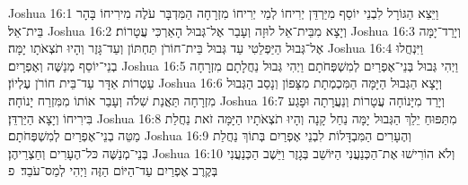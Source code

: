 Joshua 16:1	וַיֵּצֵא הַגּוֹרָל לִבְנֵי יוֹסֵף מִיַּרְדֵּן יְרִיחוֹ לְמֵי יְרִיחוֹ מִזְרָחָה הַמִּדְבָּר עֹלֶה מִירִיחוֹ בָּהָר בֵּית־אֵל׃
Joshua 16:2	וְיָצָא מִבֵּית־אֵל לוּזָה וְעָבַר אֶל־גְּבוּל הָאַרְכִּי עֲטָרוֹת׃
Joshua 16:3	וְיָרַד־יָמָּה אֶל־גְּבוּל הַיַּפְלֵטִי עַד גְּבוּל בֵּית־חוֹרֹן תַּחְתּוֹן וְעַד־גָּזֶר וְהָיוּ תֹצְאֹתָו יָמָּה׃
Joshua 16:4	וַיִּנְחֲלוּ בְנֵי־יוֹסֵף מְנַשֶּׁה וְאֶפְרָיִם׃
Joshua 16:5	וַיְהִי גְּבוּל בְּנֵי־אֶפְרַיִם לְמִשְׁפְּחֹתָם וַיְהִי גְּבוּל נַחֲלָתָם מִזְרָחָה עַטְרוֹת אַדָּר עַד־בֵּית חוֹרֹן עֶלְיוֹן׃
Joshua 16:6	וְיָצָא הַגְּבוּל הַיָּמָּה הַמִּכְמְתָת מִצָּפוֹן וְנָסַב הַגְּבוּל מִזְרָחָה תַּאֲנַת שִׁלֹה וְעָבַר אוֹתוֹ מִמִּזְרַח יָנוֹחָה׃
Joshua 16:7	וְיָרַד מִיָּנוֹחָה עֲטָרוֹת וְנַעֲרָתָה וּפָגַע בִּירִיחוֹ וְיָצָא הַיַּרְדֵּן׃
Joshua 16:8	מִתַּפּוּחַ יֵלֵךְ הַגְּבוּל יָמָּה נַחַל קָנָה וְהָיוּ תֹצְאֹתָיו הַיָּמָּה זֹאת נַחֲלַת מַטֵּה בְנֵי־אֶפְרַיִם לְמִשְׁפְּחֹתָם׃
Joshua 16:9	וְהֶעָרִים הַמִּבְדָּלוֹת לִבְנֵי אֶפְרַיִם בְּתוֹךְ נַחֲלַת בְּנֵי־מְנַשֶּׁה כּל־הֶעָרִים וְחַצְרֵיהֶן׃
Joshua 16:10	וְלֹא הוֹרִישׁוּ אֶת־הַכְּנַעֲנִי הַיּוֹשֵׁב בְּגָזֶר וַיֵּשֶׁב הַכְּנַעֲנִי בְּקֶרֶב אֶפְרַיִם עַד־הַיּוֹם הַזֶּה וַיְהִי לְמַס־עֹבֵד׃ {פ}
